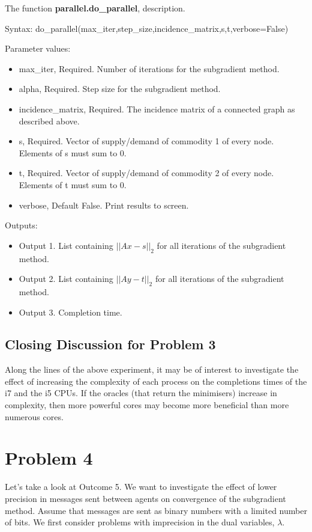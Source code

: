\documentclass[12pt]{article}
\begin{document}
The function \textbf{parallel.do\_parallel}, description.

Syntax: do\_parallel(max\_iter,step\_size,incidence\_matrix,s,t,verbose=False)

Parameter values:
\begin{itemize}
	\item max\_iter, Required. Number of iterations for the subgradient method.
	\item alpha, Required. Step size for the subgradient method.
	\item incidence\_matrix, Required. The incidence matrix of a connected graph as described above.
	\item s, Required. Vector of supply/demand of commodity 1 of every node. Elements of s must sum to 0.
	\item t, Required. Vector of supply/demand of commodity 2 of every node. Elements of t must sum to 0.
	\item verbose, Default False. Print results to screen.
\end{itemize}

Outputs:
\begin{itemize}
	\item Output 1. List containing $||Ax-s||_2$ for all iterations of the subgradient method.
	\item Output 2. List containing $||Ay-t||_2$ for all iterations of the subgradient method.
	\item Output 3. Completion time.
\end{itemize}

\subsection*{Closing Discussion for Problem 3}

Along the lines of the above experiment, it may be of interest to investigate the effect of increasing the complexity of each process on the completions times of the i7 and the i5 CPUs. If the oracles (that return the minimisers) increase in complexity, then more powerful cores may become more beneficial than more numerous cores.

\section*{Problem 4}

Let's take a look at Outcome 5. We want to investigate the effect of lower precision in messages sent between agents on convergence of the subgradient method. Assume that messages are sent as binary numbers with a limited number of bits. We first consider problems with imprecision in the dual variables, $\lambda$.
\end{document}
